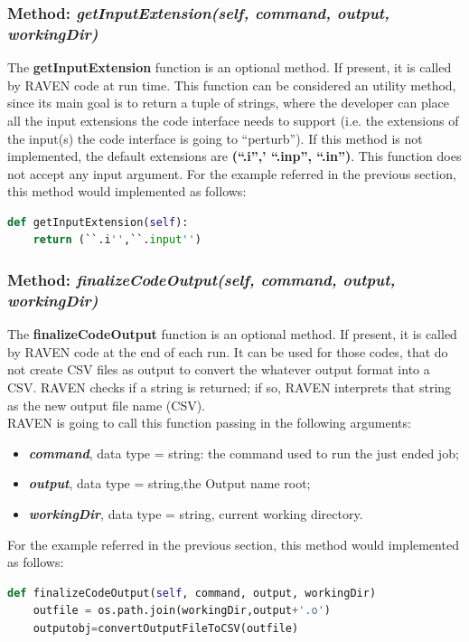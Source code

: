 \subsubsection{Method: \textit{getInputExtension(self, command, output, workingDir)}} 
\label{subsubsec:getInputExtension}
The \textbf{getInputExtension} function is an optional method. If present, it is called 
by RAVEN code at run time.  This function can be considered an utility method, since its
main goal is to return a tuple of strings, where the developer can place all the input extensions
the code interface needs to support (i.e. the extensions of the input(s) the code interface
is going to ``perturb''). If this method is not implemented, the default extensions are  \textbf{(``.i'',' ``.inp'', ``.in'')}.
This function does not accept any input argument.
For the example referred in the previous section, this method would implemented as follows:
\newline
\begin{lstlisting}[language=python]
def getInputExtension(self):
    return (``.i'',``.input'')
 \end{lstlisting} 
\subsubsection{Method: \textit{finalizeCodeOutput(self, command, output, workingDir)}} 
\label{subsubsec:finializeCodeOutput}
The \textbf{finalizeCodeOutput} function is an optional method. If present, it is called 
by RAVEN code at the end of each run. It can be used for those codes, that do not create CSV 
files as output to convert the whatever output format into a CSV. RAVEN checks if a string is returned; 
if so, RAVEN interprets that string as the new output file name (CSV).
\\RAVEN is going to call this function passing in the following arguments:
\begin{itemize}
  \item \textbf{\textit{command}}, data type = string: the command used to run 
                    the just ended job;
  \item \textbf{\textit{output}}, data type = string,the Output name root;
  \item  \textbf{\textit{workingDir}}, data type = string, current working directory.
\end{itemize}
For the example referred in the previous section, this method would implemented as follows:
\newline
\begin{lstlisting}[language=python]
def finalizeCodeOutput(self, command, output, workingDir)
    outfile = os.path.join(workingDir,output+'.o')
    outputobj=convertOutputFileToCSV(outfile)
 \end{lstlisting} 
 


